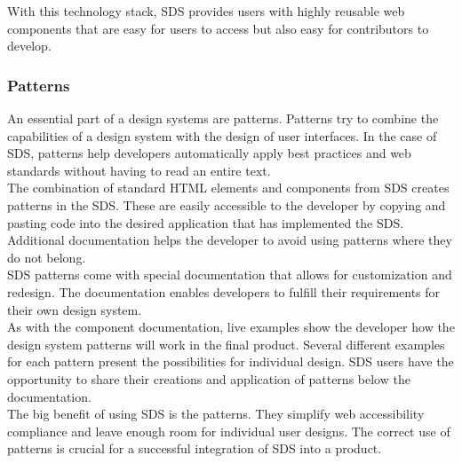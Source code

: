 With this technology stack, \ac{SDS} provides users with highly reusable web components that are easy for users to access but also easy for contributors to develop.


\subsubsection{Patterns}
An essential part of a design systems are patterns. Patterns try to combine the capabilities of a design system with the design of user interfaces. In the case of \ac{SDS}, patterns help developers automatically apply best practices and web standards without having to read an entire text. \\

The combination of standard HTML elements and components from SDS creates patterns in the SDS. These are easily accessible to the developer by copying and pasting code into the desired application that has implemented the SDS. Additional documentation helps the developer to avoid using patterns where they do not belong. \\

SDS patterns come with special documentation that allows for customization and redesign. The documentation enables developers to fulfill their requirements for their own design system.\\

As with the component documentation, live examples show the developer how the design system patterns will work in the final product. Several different examples for each pattern present the possibilities for individual design. \ac{SDS} users have the opportunity to share their creations and application of patterns below the documentation. \\

The big benefit of using SDS is the patterns. They simplify web accessibility compliance and leave enough room for individual user designs. The correct use of patterns is crucial for a successful integration of \ac{SDS} into a product.
